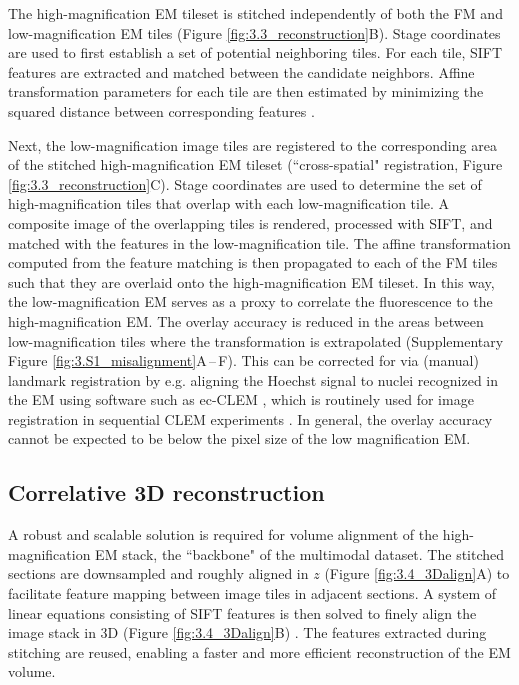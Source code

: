 The high-magnification EM tileset is stitched independently of both the FM and low-magnification EM tiles (Figure \ref{fig:3.3_reconstruction}B). Stage coordinates are used to first establish a set of potential neighboring tiles. For each tile, SIFT features are extracted and matched between the candidate neighbors. Affine transformation parameters for each tile are then estimated by minimizing the squared distance between corresponding features \cite{saalfeld2012elastic, khairy2018joint}.

Next, the low-magnification image tiles are registered to the corresponding area of the stitched high-magnification EM tileset (``cross-spatial" registration, Figure \ref{fig:3.3_reconstruction}C). Stage coordinates are used to determine the set of high-magnification tiles that overlap with each low-magnification tile. A composite image of the overlapping tiles is rendered, processed with SIFT, and matched with the features in the low-magnification tile. The affine transformation computed from the feature matching is then propagated to each of the FM tiles such that they are overlaid onto the high-magnification EM tileset. In this way, the low-magnification EM serves as a proxy to correlate the fluorescence to the high-magnification EM. The overlay accuracy is reduced in the areas between low-magnification tiles where the transformation is extrapolated (Supplementary Figure \ref{fig:3.S1_misalignment}A\,--\,F). This can be corrected for via (manual) landmark registration by e.g. aligning the Hoechst signal to nuclei recognized in the EM using software such as ec-CLEM \cite{paul2017ec}, which is routinely used for image registration in sequential CLEM experiments \cite{franke2019correlative, tuijtel2019correlative, lee2020selective}. In general, the overlay accuracy cannot be expected to be below the pixel size of the low magnification EM.


\subsection{Correlative 3D reconstruction}
\label{sec:3R_3Dalign}
A robust and scalable solution is required for volume alignment of the high-magnification EM stack, the ``backbone" of the multimodal dataset. The stitched sections are downsampled and roughly aligned in $z$ (Figure \ref{fig:3.4_3Dalign}A) to facilitate feature mapping between image tiles in adjacent sections. A system of linear equations consisting of SIFT features is then solved to finely align the image stack in 3D (Figure \ref{fig:3.4_3Dalign}B) \cite{khairy2018joint}. The features extracted during stitching are reused, enabling a faster and more efficient reconstruction of the EM volume.

